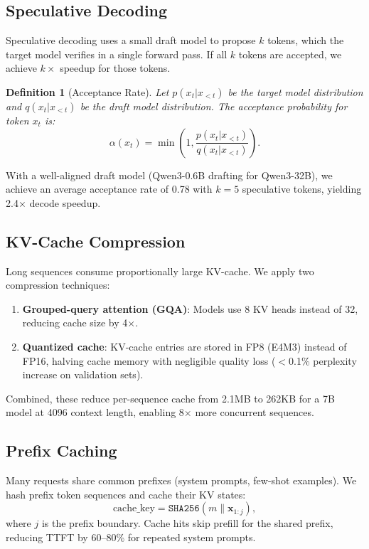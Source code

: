 \documentclass[11pt]{article}
\newtheorem{definition}{Definition}
\begin{document}
\subsection{Speculative Decoding}

Speculative decoding uses a small draft model to propose $k$ tokens, which the
target model verifies in a single forward pass. If all $k$ tokens are accepted,
we achieve $k\times$ speedup for those tokens.

\begin{definition}[Acceptance Rate]
Let $p(x_t | x_{<t})$ be the target model distribution and $q(x_t | x_{<t})$
be the draft model distribution. The acceptance probability for token $x_t$ is:
\begin{equation}
\alpha(x_t) = \min\left(1, \frac{p(x_t | x_{<t})}{q(x_t | x_{<t})}\right).
\end{equation}
\end{definition}

With a well-aligned draft model (Qwen3-0.6B drafting for Qwen3-32B), we
achieve an average acceptance rate of 0.78 with $k=5$ speculative tokens,
yielding 2.4$\times$ decode speedup.

\subsection{KV-Cache Compression}

Long sequences consume proportionally large KV-cache. We apply two compression
techniques:
\begin{enumerate}[leftmargin=1.4em]
    \item \textbf{Grouped-query attention (GQA)}: Models use 8 KV heads instead
    of 32, reducing cache size by 4$\times$.
    \item \textbf{Quantized cache}: KV-cache entries are stored in FP8 (E4M3)
    instead of FP16, halving cache memory with negligible quality loss
    ($<$0.1\% perplexity increase on validation sets).
\end{enumerate}

Combined, these reduce per-sequence cache from 2.1MB to 262KB for a 7B model
at 4096 context length, enabling 8$\times$ more concurrent sequences.

\subsection{Prefix Caching}

Many requests share common prefixes (system prompts, few-shot examples). We
hash prefix token sequences and cache their KV states:
\begin{equation}
\text{cache\_key} = \texttt{SHA256}(m \| \mathbf{x}_{1:j}),
\end{equation}
where $j$ is the prefix boundary. Cache hits skip prefill for the shared prefix,
reducing TTFT by 60--80\% for repeated system prompts.
\end{document}
